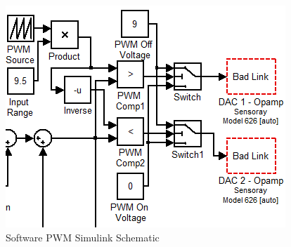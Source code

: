 


\begin{figure}[h]
    \centering
    \includegraphics[scale=0.75]{images/SWPWM.PNG}
    \caption{Software PWM Simulink Schematic}
    \label{fig:SWPWM}
\end{figure}
